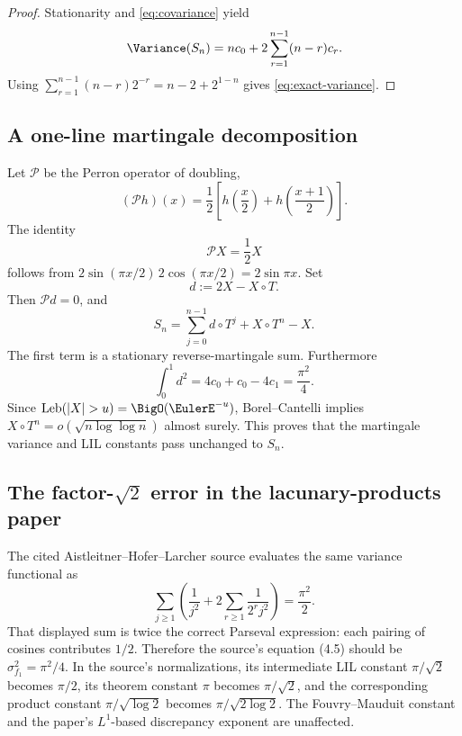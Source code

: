 \documentclass[11pt]{article}
\theoremstyle{definition}
\theoremstyle{remark}
\newcommand{\Leb}{\operatorname{Leb}}
\newcommand{\T}{T}
\begin{document}
\begin{proof}
Stationarity and \eqref{eq:covariance} yield
\[
 \Variance(S_n)=nc_0+2\sum_{r=1}^{n-1}(n-r)c_r.
\]
Using \(\sum_{r=1}^{n-1}(n-r)2^{-r}=n-2+2^{1-n}\) gives
\eqref{eq:exact-variance}.
\end{proof}

\subsection{A one-line martingale decomposition}

Let \(\mathcal P\) be the Perron operator of doubling,
\begin{equation}
 (\mathcal Ph)(x)=\frac12\left[h\!\left(\frac x2\right)
 +h\!\left(\frac{x+1}{2}\right)\right].
 \label{eq:Perron-unweighted}
\end{equation}
The identity
\begin{equation}
 \mathcal PX=\frac12X
 \label{eq:PX}
\end{equation}
follows from \(2\sin(\pi x/2)\,2\cos(\pi x/2)=2\sin\pi x\).
Set
\begin{equation}
 d:=2X-X\circ\T.
 \label{eq:d}
\end{equation}
Then \(\mathcal Pd=0\), and
\begin{equation}
 S_n=\sum_{j=0}^{n-1}d\circ\T^j+X\circ\T^n-X.
 \label{eq:martingale-decomp}
\end{equation}
The first term is a stationary reverse-martingale sum.  Furthermore
\begin{equation}
 \int_0^1d^2
 =4c_0+c_0-4c_1=\frac{\pi^2}{4}.
 \label{eq:d-variance}
\end{equation}
Since \(\Leb(|X|>u)=\BigO(\EulerE^{-u})\), Borel--Cantelli implies
\(X\circ\T^n=o(\sqrt{n\log\log n})\) almost surely.  This proves that the
martingale variance and LIL constants pass unchanged to \(S_n\).

\subsection{The factor-\texorpdfstring{\(\sqrt2\)}{sqrt(2)} error in the lacunary-products paper}

The cited Aistleitner--Hofer--Larcher source\cite{ahl2017,ahl-source} evaluates the same variance
functional as
\[
 \sum_{j\ge1}\left(\frac1{j^2}
 +2\sum_{r\ge1}\frac1{2^rj^2}\right)=\frac{\pi^2}{2}.
\]
That displayed sum is twice the correct Parseval expression: each pairing of
cosines contributes \(1/2\).  Therefore the source's equation (4.5) should be
\(\sigma_{f_1}^2=\pi^2/4\).  In the source's normalizations, its intermediate
LIL constant \(\pi/\sqrt2\) becomes \(\pi/2\), its theorem constant \(\pi\)
becomes \(\pi/\sqrt2\), and the corresponding product constant
\(\pi/\sqrt{\log2}\) becomes
\(\pi/\sqrt{2\log2}\).  The Fouvry--Mauduit constant and the paper's
\(L^1\)-based discrepancy exponent are unaffected.
\end{document}
